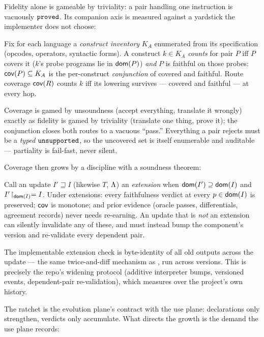 Fidelity alone is gameable by triviality: a pair handling one instruction
is vacuously $\mathtt{proved}$. Its companion axis is measured against a yardstick
the implementer does not choose:

\begin{definition}[Coverage]
\label{def:coverage}
Fix for each language a \emph{construct inventory} $K_A$ enumerated from
its specification (opcodes, operators, syntactic forms). A construct
$k \in K_A$ \emph{counts} for pair $P$ iff $P$ covers it
($k$'s probe programs lie in $\mathsf{dom}(P)$) \emph{and} $P$ is faithful on
those probes: $\mathsf{cov}(P) \subseteq K_A$ is the per-construct
\emph{conjunction} of covered and faithful. Route coverage $\mathsf{cov}(R)$
counts $k$ iff its lowering survives --- covered and faithful --- at every
hop.
\end{definition}

Coverage is gamed by unsoundness (accept everything, translate it
wrongly) exactly as fidelity is gamed by triviality (translate one thing,
prove it); the conjunction closes both routes to a vacuous ``pass.''
Everything a pair rejects must be a \emph{typed} $\mathtt{unsupported}$, so the
uncovered set is itself enumerable and auditable --- partiality is
fail-fast, never silent.

Coverage then grows by a discipline with a soundness theorem:

\begin{proposition}[Ratchet]
\label{prop:ratchet}
Call an update $I' \sqsupseteq I$ (likewise $T$, $\Lambda$) an
\emph{extension} when $\mathsf{dom}(I') \supseteq \mathsf{dom}(I)$ and
$I'\!\restriction_{\mathsf{dom}(I)} = I$. Under extensions: every faithfulness
verdict at every $p \in \mathsf{dom}(I)$ is preserved; $\mathsf{cov}$ is monotone; and
prior evidence (oracle passes, differentials, agreement records) never
needs re-earning. An update that is \emph{not} an extension can silently
invalidate any of these, and must instead bump the component's version
and re-validate every dependent pair.
\end{proposition}

The implementable extension check is byte-identity of all old outputs
across the update --- the same twice-and-diff mechanism as
, run across versions. This is precisely the repo's
widening protocol (additive interpreter bumps, versioned events,
dependent-pair re-validation), which  measures over
the project's own history.

The ratchet is the evolution plane's contract with the use plane:
declarations only strengthen, verdicts only accumulate. What directs
the growth is the demand the use plane records:

